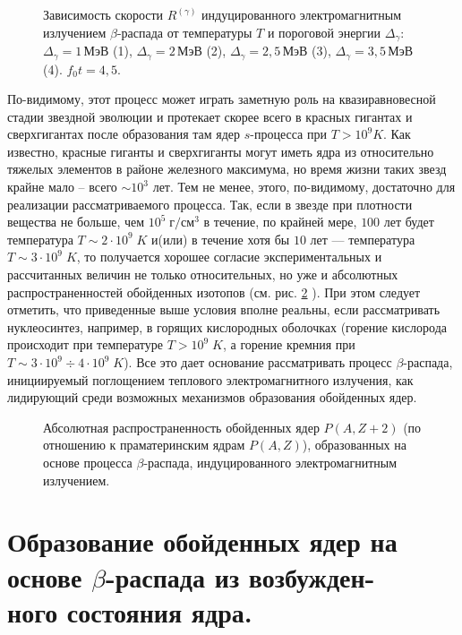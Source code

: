\begin{figure}
\vspace{18 true cm}
\caption{{Зависимость скорости $R^{(\gamma)}$  индуцированного
электромагнитным излучением $\beta$-распада
от температуры $T$ и
пороговой энергии $\Delta_\gamma$:
$\Delta_\gamma=1\, МэВ$ (1), $\Delta_\gamma=2\, МэВ$ (2),
$\Delta_\gamma=2,5\, МэВ$ (3), $\Delta_\gamma=3,5\, МэВ$ (4).
$f_0t=4,5$.
}}
\label{SCOR}
\end{figure}
По-видимому,  этот процесс может играть заметную роль на квазиравновесной
стадии звездной эволюции и протекает скорее всего в красных гигантах
и сверхгигантах после образования там ядер $s$-процесса при $T>10^9 K$.
Как известно, красные гиганты и сверхгиганты могут иметь ядра из относительно тяжелых
элементов в районе железного максимума,
но время жизни таких звезд крайне мало -- всего $\sim 10^3$ лет.
Тем не менее, этого, по-видимому, достаточно для реализации рассматриваемого
процесса. Так, если в звезде при плотности вещества не больше, чем $10^5\; г/см^3$
в течение, по крайней мере, $100$ лет будет
температура $T\sim 2\cdot 10^9\; K$ и(или) в течение хотя бы $10$ лет --- температура
$T\sim 3\cdot 10^9\; K$,
то получается хорошее согласие экспериментальных и рассчитанных
величин не только относительных, но уже и абсолютных распространенностей
обойденных изотопов (см. рис. \ref{abs} ). При этом следует отметить,
что приведенные выше условия
вполне реальны, если рассматривать нуклеосинтез, например, в горящих
кислородных оболочках
(горение кислорода происходит при температуре
$T>10^9 \; K$, а горение кремния при $T\sim 3\cdot 10^9 \div 4\cdot 10^9\; K $).
Все это дает основание рассматривать процесс
$\beta$-распада, инициируемый
поглощением теплового электромагнитного излучения,
как
лидирующий среди возможных механизмов образования обойденных ядер.


\begin{figure}
\vspace{18 true cm}
\caption{{ Абсолютная распространенность обойденных ядер $P(A,Z+2)$
(по отношению к праматеринским ядрам $P(A,Z)$), образованных
на основе процесса
$\beta$-распада, индуцированного электромагнитным излучением.}}
\label{abs}
\end{figure}





\section{Образование обойденных ядер на \\ основе $\beta$-распада из
возбужден- \\ ного состояния ядра.}

